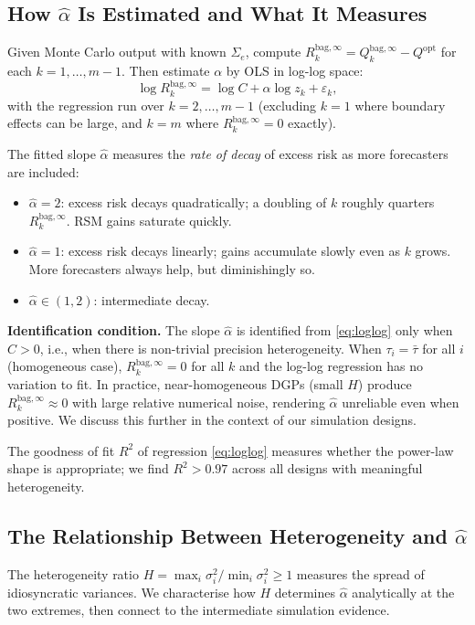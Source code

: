 \documentclass[12pt,a4paper]{article}
\theoremstyle{definition}
\newcommand{\Qopt}{Q^{\mathrm{opt}}}
\newcommand{\Qbag}{Q_k^{\mathrm{bag},\infty}}
\newcommand{\Rk}{R_k^{\mathrm{bag},\infty}}
\begin{document}
\subsection{How $\hat\alpha$ Is Estimated and What It Measures}

Given Monte Carlo output with known $\Sigma_e$, compute
$\Rk=\Qbag - \Qopt$ for each $k=1,\ldots,m-1$.  Then estimate $\alpha$
by OLS in log-log space:
\begin{equation}\label{eq:loglog}
  \log\Rk = \log C + \alpha\log z_k + \varepsilon_k,
\end{equation}
with the regression run over $k=2,\ldots,m-1$ (excluding $k=1$ where
boundary effects can be large, and $k=m$ where $\Rk=0$ exactly).

The fitted slope $\hat\alpha$ measures the \emph{rate of decay} of excess
risk as more forecasters are included:
\begin{itemize}[nosep]
  \item $\hat\alpha=2$: excess risk decays quadratically; a doubling of $k$
    roughly quarters $\Rk$.  RSM gains saturate quickly.
  \item $\hat\alpha=1$: excess risk decays linearly; gains accumulate slowly
    even as $k$ grows.  More forecasters always help, but diminishingly so.
  \item $\hat\alpha\in(1,2)$: intermediate decay.
\end{itemize}

\textbf{Identification condition.}  The slope $\hat\alpha$ is identified
from \eqref{eq:loglog} only when $C>0$, i.e., when there is non-trivial
precision heterogeneity.  When $\tau_i=\bar\tau$ for all $i$ (homogeneous
case), $\Rk=0$ for all $k$ and the log-log regression has no variation to
fit.  In practice, near-homogeneous DGPs (small $H$) produce $\Rk\approx 0$
with large relative numerical noise, rendering $\hat\alpha$ unreliable even
when positive.  We discuss this further in the context of our simulation
designs.

The goodness of fit $R^2$ of regression \eqref{eq:loglog} measures whether
the power-law shape is appropriate; we find $R^2>0.97$ across all designs
with meaningful heterogeneity.

\subsection{The Relationship Between Heterogeneity and $\hat\alpha$}
\label{sec:H_alpha}

The heterogeneity ratio $H=\max_i\sigma_i^2/\min_i\sigma_i^2\ge 1$
measures the spread of idiosyncratic variances.  We characterise how $H$
determines $\hat\alpha$ analytically at the two extremes, then connect to
the intermediate simulation evidence.
\end{document}
